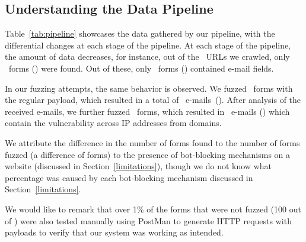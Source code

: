\subsection[The Pipeline]{Understanding the Data Pipeline}
Table~\ref{tab:pipeline} showcases the data gathered by our pipeline, with the differential changes at each stage of the pipeline. At each stage of the pipeline, the amount of data decreases, for instance, out of the \urls\ URLs we crawled, only \forms\ forms (\formsDelta) were found. Out of these, only \emailforms\ forms (\emailformsDelta) contained e-mail fields.

In our fuzzing attempts, the same behavior is observed. We fuzzed \fuzzed\ forms with the regular payload, which resulted in a total of \recd\ e-mails~(\recdDelta). After analysis of the received e-mails, we further fuzzed \malfuzzed\ forms, which resulted in \success\ e-mails (\successDelta) which contain the vulnerability across \ips IP addresses from \domains domains.

We attribute the difference in the number of forms found to the number of forms fuzzed (a difference of \diffFoundFuzz forms) to the presence of bot-blocking mechanisms on a website (discussed in Section~\ref{limitations}), though we do not know what percentage was caused by each bot-blocking mechanism discussed in Section~\ref{limitations}. 

We would like to remark that over 1\% of the forms that were not fuzzed (100 out of \diffFoundFuzz) were also tested manually using PostMan to generate HTTP requests with payloads to verify that our system was working as intended.




